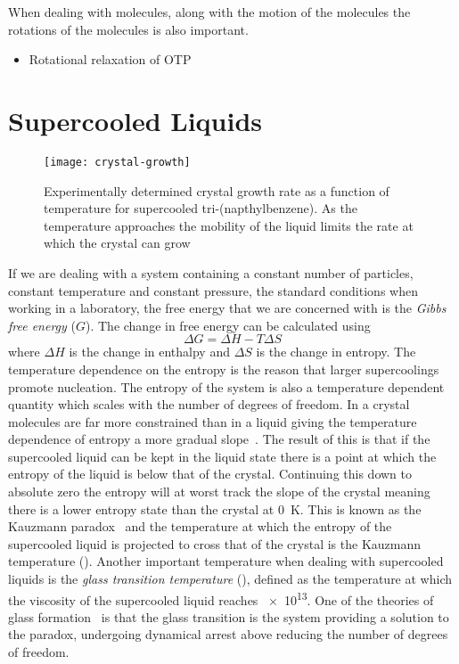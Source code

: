 When dealing with molecules, along with the motion of the molecules the rotations of the molecules is also important. 


\begin{itemize}
    \item Rotational relaxation of OTP~\cite{eastwood:13}
\end{itemize}


\section{Supercooled Liquids}


\begin{figure}
    \centering
    \texttt{[image: crystal-growth]}
    \caption[Crystal growth rate as a function of temperature]{Experimentally determined crystal growth rate as a function of temperature for supercooled tri-(napthylbenzene). As the temperature approaches \si{\Tg} the mobility of the liquid limits the rate at which the crystal can grow}
    \label{fig:crys rate}
\end{figure}

If we are dealing with a system containing a constant number of particles, constant temperature and constant pressure, the standard conditions when working in a laboratory, the free energy that we are concerned with is the \emph{Gibbs free energy} ($G$). The change in free energy can be calculated using
\begin{equation}
    \Delta G = \Delta H - T\Delta S
\end{equation}
where $\Delta H$ is the change in enthalpy and $\Delta S$ is the change in entropy. The temperature dependence on the entropy is the reason that larger supercoolings promote nucleation. The entropy of the system is also a temperature dependent quantity which scales with the number of degrees of freedom. In a crystal molecules are far more constrained than in a liquid giving the temperature dependence of entropy a more gradual slope~. The result of this is that if the supercooled liquid can be kept in the liquid state there is a point at which the entropy of the liquid is below that of the crystal. Continuing this down to absolute zero the entropy will at worst track the slope of the crystal meaning there is a lower entropy state than the crystal at \SI{0}{\kelvin}. This is known as the Kauzmann paradox~\cite{kauzmann:48} and the temperature at which the entropy of the supercooled liquid is projected to cross that of the crystal is the Kauzmann temperature (\si{\Tk}). Another important temperature when dealing with supercooled liquids is the \emph{glass transition temperature} (\si{\Tg}), defined as the temperature at which the viscosity of the supercooled liquid reaches \SI{e13}{\poise}. One of the theories of glass formation~\cite{debenedetti:01} is that the glass transition is the system providing a solution to the paradox, undergoing dynamical arrest above \si{\Tk} reducing the number of degrees of freedom.

